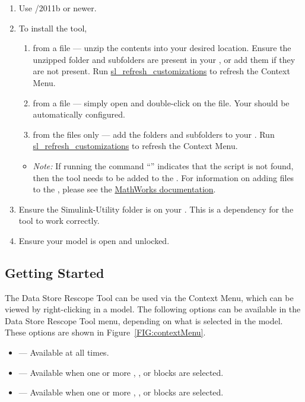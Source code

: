 \documentclass{article}
\makeatletter
\newcommand{\ToolName}{Data Store Rescope Tool\@\xspace}
\newcommand{\menu}[2]{%
	\ifthenelse{\equal{#1}{1}}{Rescope All}{}%
  	\ifthenelse{\equal{#1}{2}}{Rescope Selected}{}%
  	\ifthenelse{\equal{#1}{3}}{Rescope Non-Selected}{}%
}
\makeatother
\begin{document}
\begin{enumerate}
  \item Use \Matlab/\Simulink 2011b or newer.
	\item To install the tool,
	\begin{enumerate}
		\item from a  file --- unzip the contents into your desired location. Ensure the unzipped folder and subfolders are present in your \mpath, or add them if they are not present. Run \href{https://www.mathworks.com/help/simulink/ug/registering-customizations.html}{sl\_refresh\_customizations} to refresh the Context Menu. 
		\item from a  file --- simply open \Matlab and double-click on the file. Your \mpath should be automatically configured.
		\item from the files only --- add the folders and subfolders to your \mpath. Run \href{https://www.mathworks.com/help/simulink/ug/registering-customizations.html}{sl\_refresh\_customizations} to refresh the Context Menu.
	\end{enumerate}
	\begin{itemize}
		\item \textit{Note:} If running the command ``'' indicates that the script is not found, then the tool needs to be added to the \mpath.
		For information on adding files to the \mpath, please see the \href{https://www.mathworks.com/help/matlab/matlab_env/add-remove-or-reorder-folders-on-the-search-path.html}{MathWorks documentation}.
	\end{itemize}
	\item Ensure the Simulink-Utility folder is on your \mpath. This is a dependency for the tool to work correctly.
	\item Ensure your model is open and unlocked.
\end{enumerate}

\subsection{Getting Started}
The \ToolName can be used via the \Simulink Context Menu, which can be viewed by right-clicking in a model. The following options can be available in the \ToolName menu, depending on what is selected in the model. These options are shown in Figure~\ref{FIG:contextMenu}.
\begin{itemize}
	\item \emph{} --- Available at all times.
	\item \emph{} --- Available when one or more \DSM, \DSR, or \DSW blocks are selected.
	\item \emph{} --- Available when one or more \DSM, \DSR, or \DSW blocks are selected.
\end{itemize}
\end{document}
